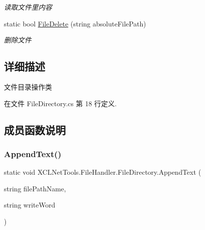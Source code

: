 \begin{DoxyCompactItemize}
\begin{DoxyCompactList}\small\item\em 读取文件里内容 \end{DoxyCompactList}\item 
static bool \hyperlink{class_x_c_l_net_tools_1_1_file_handler_1_1_file_directory_a8ce6f5c7bf94c4fe2770993cef7be536}{File\+Delete} (string absolute\+File\+Path)
\begin{DoxyCompactList}\small\item\em 删除文件 \end{DoxyCompactList}\end{DoxyCompactItemize}


\subsection{详细描述}
文件目录操作类 



在文件 File\+Directory.\+cs 第 18 行定义.



\subsection{成员函数说明}
\mbox{\label{class_x_c_l_net_tools_1_1_file_handler_1_1_file_directory_a7153ad7012f2c7259a89cc1f44fa57e2}} 
\subsubsection{\texorpdfstring{Append\+Text()}{AppendText()}\hspace{0.1cm}{\footnotesize\ttfamily [1/2]}}
{\footnotesize\ttfamily static void X\+C\+L\+Net\+Tools.\+File\+Handler.\+File\+Directory.\+Append\+Text (\begin{DoxyParamCaption}\item[{string}]{file\+Path\+Name,  }\item[{string}]{write\+Word }\end{DoxyParamCaption})\hspace{0.3cm}{\ttfamily [static]}}



